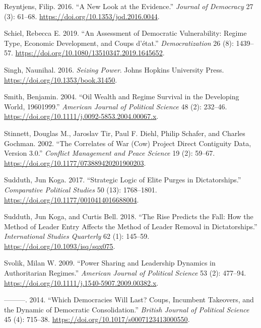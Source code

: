 \documentclass[
  12pt,
]{report}
\newlength{\cslhangindent}
\newenvironment{CSLReferences}[2] %
 {\begin{list}{}{%
  \setlength{\itemindent}{0pt}
  \setlength{\leftmargin}{0pt}
  \setlength{\parsep}{0pt}
  \ifodd #1
   \setlength{\leftmargin}{\cslhangindent}
   \setlength{\itemindent}{-1\cslhangindent}
  \fi
  \setlength{\itemsep}{#2\baselineskip}}}
 {\end{list}}
\begin{document}
\begin{CSLReferences}{1}{0}
Reyntjens, Filip. 2016. {``A New Look at the Evidence.''} \emph{Journal
of Democracy} 27 (3): 61--68.
\url{https://doi.org/10.1353/jod.2016.0044}.

Schiel, Rebecca E. 2019. {``An Assessment of Democratic Vulnerability:
Regime Type, Economic Development, and Coups d{'}état.''}
\emph{Democratization} 26 (8): 1439--57.
\url{https://doi.org/10.1080/13510347.2019.1645652}.

Singh, Naunihal. 2016. \emph{Seizing Power}. Johns Hopkins University
Press. \url{https://doi.org/10.1353/book.31450}.

Smith, Benjamin. 2004. {``Oil Wealth and Regime Survival in the
Developing World, 1960{\textendash}1999.''} \emph{American Journal of
Political Science} 48 (2): 232--46.
\url{https://doi.org/10.1111/j.0092-5853.2004.00067.x}.

Stinnett, Douglas M., Jaroslav Tir, Paul F. Diehl, Philip Schafer, and
Charles Gochman. 2002. {``The Correlates of War (Cow) Project Direct
Contiguity Data, Version 3.0.''} \emph{Conflict Management and Peace
Science} 19 (2): 59--67.
\url{https://doi.org/10.1177/073889420201900203}.

Sudduth, Jun Koga. 2017. {``Strategic Logic of Elite Purges in
Dictatorships.''} \emph{Comparative Political Studies} 50 (13):
1768--1801. \url{https://doi.org/10.1177/0010414016688004}.

Sudduth, Jun Koga, and Curtis Bell. 2018. {``The Rise Predicts the Fall:
How the Method of Leader Entry Affects the Method of Leader Removal in
Dictatorships.''} \emph{International Studies Quarterly} 62 (1):
145--59. \url{https://doi.org/10.1093/isq/sqx075}.

Svolik, Milan W. 2009. {``Power Sharing and Leadership Dynamics in
Authoritarian Regimes.''} \emph{American Journal of Political Science}
53 (2): 477--94. \url{https://doi.org/10.1111/j.1540-5907.2009.00382.x}.

---------. 2014. {``Which Democracies Will Last? Coups, Incumbent
Takeovers, and the Dynamic of Democratic Consolidation.''} \emph{British
Journal of Political Science} 45 (4): 715--38.
\url{https://doi.org/10.1017/s0007123413000550}.


\end{CSLReferences}
\end{document}
